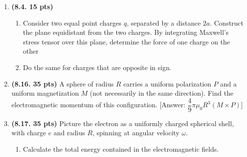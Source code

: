 \documentclass[fleqn]{article}
\begin{document}
\begin{enumerate}

    \item \textbf{(8.4. 15 pts)}
    \begin{enumerate}
      \item Consider two equal point charges $q$, separated by a distance $2a$. Construct the
      plane equidistant from the two charges. By integrating Maxwell’s stress tensor
      over this plane, determine the force of one charge on the other


      \item Do the same for charges that are opposite in sign.

      
    \end{enumerate}


    \item \textbf{(8.16. 35 pts)} A sphere of radius $R$ carries a uniform polarization $P$ and a uniform
    magnetization $M$ (not necessarily in the same direction). Find the electromagnetic momentum of this configuration.
    [Answer: $\dfrac{4}{9} \pi \mu_0 R^3 (M \times P)$]
    


    \item \textbf{(8.17. 35 pts)} Picture the electron as a uniformly charged spherical shell, with
    charge $e$ and radius $R$, spinning at angular velocity $\omega$.
    \begin{enumerate}
      \item Calculate the total energy contained in the electromagnetic fields.



\end{enumerate}
\end{enumerate}
\end{document}
